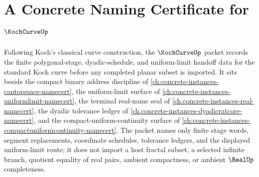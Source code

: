\chapter{A Concrete Naming Certificate for $\KochCurveUp$}
\label{ch:concrete-instances-koch-curve-namecert}

Following Koch's classical curve construction, the $\KochCurveUp$ packet records the finite polygonal-stage, dyadic-schedule, and uniform-limit handoff data for the standard Koch curve before any completed planar subset is imported. It sits beside the compact binary address discipline of \autoref{ch:concrete-instances-cantorspace-namecert}, the uniform-limit surface of \autoref{ch:concrete-instances-uniformlimit-namecert}, the terminal real-name seal of \autoref{ch:concrete-instances-real-namecert}, the dyadic tolerance ledger of \autoref{ch:concrete-instances-dyadicratcore-namecert}, and the compact-uniform-continuity surface of \autoref{ch:concrete-instances-compactuniformcontinuity-namecert}. The packet names only finite stage words, segment replacements, coordinate schedules, tolerance ledgers, and the displayed uniform-limit route; it does not import a host fractal subset, a selected infinite branch, quotient equality of real pairs, ambient compactness, or ambient $\RealUp$ completeness.

